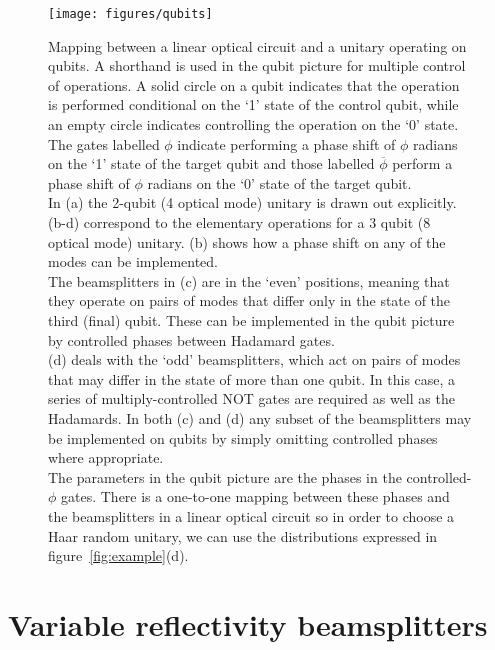 \documentclass[aps,prl,twocolumn,floatfix]{revtex4}
\begin{document}
\begin{figure}[p]
  \texttt{[image: figures/qubits]}
  \caption{Mapping between a linear optical circuit and a unitary operating on
    qubits. A shorthand is used in the qubit picture for multiple control of
    operations. A solid circle on a qubit indicates that the operation is
    performed conditional on the `1' state of the control qubit, while an empty
    circle indicates controlling the operation on the `0' state. The gates
    labelled \(\phi\) indicate performing a phase shift of \(\phi\) radians on
    the `1' state of the target qubit and those labelled \(\overline{\phi}\)
    perform a phase shift of \(\phi\) radians on the `0' state of the target
    qubit. \\
    In (a) the 2-qubit (4 optical mode) unitary is drawn out explicitly.
    (b-d) correspond to the elementary operations for a 3 qubit (8 optical mode)
    unitary. (b) shows how a phase shift on any of the modes can be
    implemented. \\
    The beamsplitters in (c) are in the `even' positions, meaning that they
    operate on pairs of modes that differ only in the state of the third (final)
    qubit. These can be implemented in the qubit picture by controlled phases
    between Hadamard gates. \\
    (d) deals with the `odd' beamsplitters, which act on
    pairs of modes that may differ in the state of more than one qubit. In this
    case, a series of multiply-controlled NOT gates are required as well as the
    Hadamards. In both (c) and (d) any subset of the beamsplitters may be
    implemented on qubits by simply omitting controlled phases where
    appropriate. \\
    The parameters in the qubit picture are the phases in the
    controlled-\(\phi\)
    gates. There is a one-to-one mapping between these phases and the
    beamsplitters in a linear optical circuit so in order to
    choose a Haar random unitary, we can use the distributions expressed in
    figure~\ref{fig:example}(d).}
  \label{fig:qubits}
\end{figure}
  


\clearpage
\appendix
\section{Variable reflectivity beamsplitters}
\end{document}
